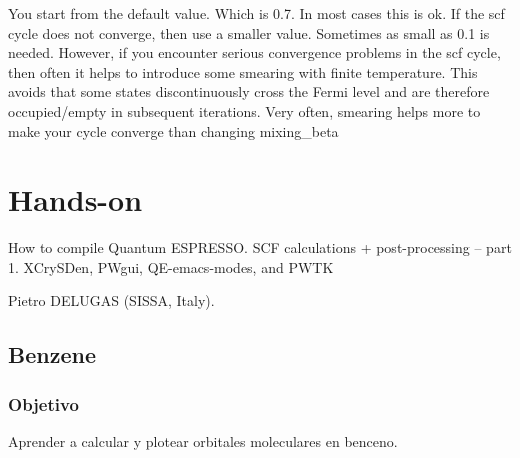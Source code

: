   You start from the default value. Which is 0.7. In most cases this is ok. If the scf cycle does not converge, then use a smaller value. Sometimes as small as 0.1 is needed. However, if you encounter serious convergence problems in the scf cycle, then often it helps to introduce some smearing with finite temperature. This avoids that some states discontinuously cross the Fermi level and are therefore occupied/empty in subsequent iterations. Very often, smearing helps more to make your cycle converge than changing mixing\_beta


\section{Hands-on}

     How to compile Quantum ESPRESSO. SCF calculations + post-processing – part 1. XCrySDen, PWgui, QE-emacs-modes, and PWTK

    	Pietro DELUGAS (SISSA, Italy).

\subsection{Benzene}

\subsubsection{Objetivo} Aprender a calcular y plotear orbitales moleculares en benceno.

